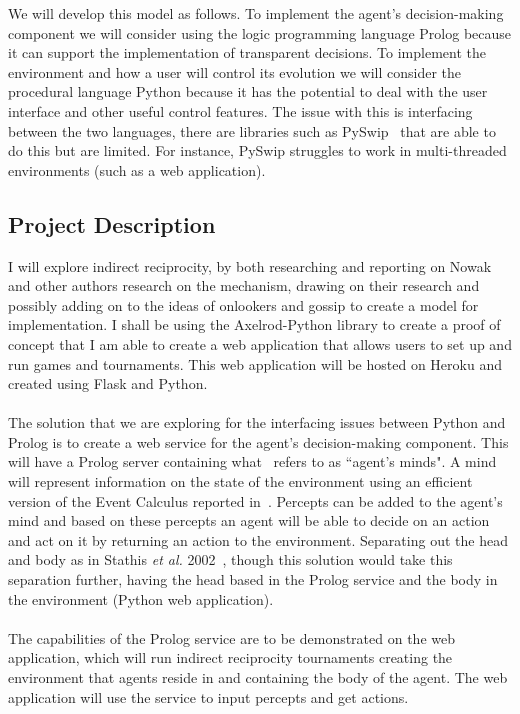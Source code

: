 \documentclass{article}
\begin{document}
We will develop this model as follows. To implement the agent's decision-making component we will consider using the logic programming language Prolog because it can support the implementation of transparent decisions. To implement the environment and how a user will control its evolution we will consider the procedural language Python because it has the potential to deal with the user interface and other useful control features. The issue with this is interfacing between the two languages, there are libraries such as PySwip~\cite{pyswip} that are able to do this but are limited. For instance, PySwip struggles to work in multi-threaded environments (such as a web application).

\subsection*{Project Description}
I will explore indirect reciprocity, by both researching and reporting on Nowak and other authors research on the mechanism, drawing on their research and possibly adding on to the ideas of onlookers and gossip to create a model for implementation. I shall be using the Axelrod-Python library to create a proof of concept that I am able to create a web application that allows users to set up and run games and tournaments. This web application will be hosted on Heroku and created using Flask and Python.\\\\
The solution that we are exploring for the interfacing issues between Python and Prolog is to create a web service for the agent's decision-making component. This will have a Prolog server containing what~\cite{prosocs} refers to as ``agent's minds". A mind will represent information on the state of the environment using an efficient version of the Event Calculus reported in~\cite{mvfcec}. Percepts can be added to the agent's mind and based on these percepts an agent will be able to decide on an action and act on it by returning an action to the environment. Separating out the head and body as in Stathis \textit{et al.} 2002~\cite{prosocs}, though this solution would take this separation further, having the head based in the Prolog service and the body in the environment (Python web application).\\\\
The capabilities of the Prolog service are to be demonstrated on the web application, which will run indirect reciprocity tournaments creating the environment that agents reside in and containing the body of the agent. The web application will use the service to input percepts and get actions.\\\\
\end{document}
